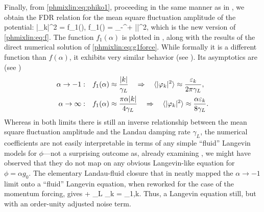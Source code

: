 Finally, from \eqref{phmixlin:eq:phiko1}, 
proceeding in the same manner as in , we obtain the FDR 
relation for the mean square fluctuation amplitude of the potential:
\beq
\la |\phi_k|^2 \ra =  f_1(\alpha), \quad
f_1(\alpha) = \int_{-\infty}^{+\infty}\rmd\zeta
\lt|\rt|^2,
\label{phmixlin:eq:f1}
\eeq
which is the new version of \eqref{phmixlin:eq:f}. 
The function $f_1(\alpha)$ is plotted in , along with
the results of the direct numerical solution of \eqref{phmixlin:eq:g1force}.
While formally it is a different function than $f(\alpha)$, 
it exhibits very similar behavior (see ).  
Its asymptotics are (see )
\begin{align}
\label{phmixlin:eq:FDR_small1}
\alpha\to-1: & \quad
f_1(\alpha) \approx \frac{|k|}{\gamma_L}
\quad\Rightarrow\quad
\langle|\varphi_k|^2\rangle\approx \frac{\varepsilon_k}{2\pi \gamma_L},\\
\alpha\to\infty: & \quad
f_1(\alpha) \approx \frac{\pi\alpha |k|}{4 \gamma_L}
\quad\Rightarrow\quad
\langle|\varphi_k|^2\rangle\approx \frac{\alpha \varepsilon_k}{8 \gamma_L}.
\label{phmixlin:eq:FDR_large1}
\end{align}
Whereas in both limits there is still an inverse relationship between 
the mean square fluctuation amplitude and the Landau damping rate 
$\gamma_L$, the numerical coefficients are not easily interpretable 
in terms of any simple ``fluid'' Langevin models for $\phi$---not a
surprising outcome as, already examining , 
we might have observed that they do not map on any obvious 
Langevin-like equation for $\phi=\alpha g_0$.
The elementary Landau-fluid closure that in  neatly 
mapped the $\alpha\to-1$ limit onto a ``fluid'' Langevin equation, 
when reworked for the case of the momentum forcing, gives
\beq
{} + \gamma_L \phi_k = \chi_{1,k}.
\label{phmixlin:eq:LF1}
\eeq
Thus, a Langevin equation still, but with an order-unity adjusted noise term.  




